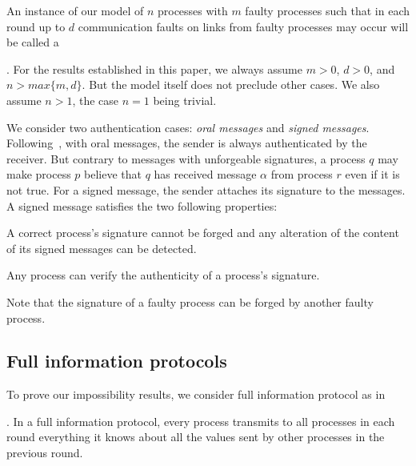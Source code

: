 An instance of our model of $n$ processes with $m$ 
faulty processes such that in each round up to $d$ communication faults
on links from faulty processes may occur will be called a {. For the results established in this paper, we always assume $m>0$, $d>0$, and $n > 
max\{m,d\}$. But the model itself does not preclude other cases. We also assume $n>1$, the case $n=1$ being trivial. 

\vspace{1em}
 We consider two authentication cases:
 \emph{oral messages} and \emph{signed messages}.
Following~\cite{lamport1982byzantine,srikanth1987optimal}, with oral messages, the
sender is always
authenticated by the receiver. But contrary to messages with
unforgeable signatures, a process $q$ may make process $p$ believe that $q$ has received
message $\alpha$ from process $r$ even if it is not true.
For a signed message,  the sender attaches its
signature to the messages. 
A signed message satisfies the two following properties: 

\begin{enumeratealpha}
  \item A correct process's signature cannot be
    forged and any alteration of the content of its signed messages
    can be detected. 
  \item Any process can verify the authenticity of a process's
    signature. 
\end{enumeratealpha}
Note that the signature of a faulty process can be forged by
another faulty process. 

\subsection{Full information protocols}
To prove our impossibility results, we consider full information protocol as in 
{\cite{fischer1982lower,lamport1982byzantine,lynch1996distributed}. In a full information
protocol, every process transmits to all processes in each round everything it knows
about all the values sent by other processes in the previous round.

}}
